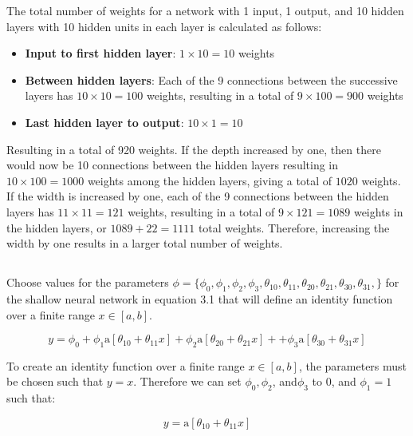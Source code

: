 \documentclass[12pt]{report}
\begin{document}
The total number of weights for a network with 1 input, 1 output, and 10 hidden layers with 10 hidden units in each layer is calculated as follows:

\begin{itemize}
    \item \textbf{Input to first hidden layer}: $1 \times 10 = 10$ weights
    \item \textbf{Between hidden layers}: Each of the 9 connections between the successive layers has $10 \times 10 = 100$ weights, resulting in a total of $9 \times 100 = 900$ weights
    \item \textbf{Last hidden layer to output}: $10 \times 1 = 10$
\end{itemize}

Resulting in a total of 920 weights. If the depth increased by one, then there would now be 10 connections between the hidden layers resulting in $10 \times 100 = 1000$ weights among the hidden layers, giving a total of $1020$ weights. If the width is increased by one, each of the 9 connections between the hidden layers has $11 \times 11 = 121$ weights, resulting in a total of $ 9 \times 121 = 1089$ weights in the hidden layers, or $1089 + 22 = 1111$ total weights. Therefore, increasing the width by one results in a larger total number of weights.

\subsection{}
\begin{mdframed}
    Choose values for the parameters $\phi = \{\phi_{0}, \phi_{1}, \phi_{2}, \phi_{3}, \theta_{10}, \theta_{11}, \theta_{20}, \theta_{21}, \theta_{30}, \theta_{31},\}$ for the shallow neural network in equation 3.1 that will define an identity function over a finite range $x \in [a,b]$.

    \begin{equation}
        y = \phi_{0} + \phi_{1}\text{a}[\theta_{10} + \theta_{11}x] + \phi_{2}\text{a}[\theta_{20} + \theta_{21}x] + + \phi_{3}\text{a}[\theta_{30} + \theta_{31}x]
        \tag{3.1}
    \end{equation}
\end{mdframed}

To create an identity function over a finite range $x \in [a,b]$, the parameters must be chosen such that $y = x$. Therefore we can set $\phi_{0}, \phi_{2}$, and$ \phi_{3}$ to 0, and $\phi_{1} = 1$ such that:

\begin{equation*}
    y = \text{a}[\theta_{10} + \theta_{11}x]
\end{equation*}
\end{document}
